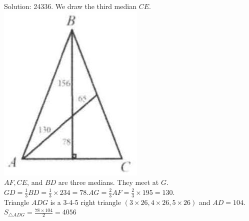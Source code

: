 \documentclass[10pt]{article}
\begin{document}
Solution: 24336.
We draw the third median \(C E\).\\
\includegraphics[max width=\textwidth, center]{2025_04_17_97bc1f7e44d93c271a88g-010(1)}\\
\(A F, C E\), and \(B D\) are three medians. They meet at \(G\).\\
\(G D=\frac{1}{3} B D=\frac{1}{3} \times 234=78 . A G=\frac{2}{3} A F=\frac{2}{3} \times 195=130\).\\
Triangle \(A D G\) is a 3-4-5 right triangle \((3 \times 26,4 \times 26,5 \times 26)\) and \(A D=104\).\\
\(S_{\triangle A D G}=\frac{78 \times 104}{2}=4056\)\\
\end{document}
